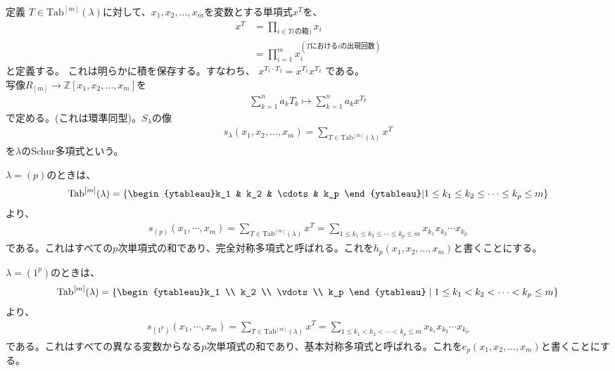 \documentclass[a4paper,11pt]{jsarticle}
\theoremstyle{plain}
\theoremstyle{definition}
\renewcommand{\(}{\left(}
\renewcommand{\)}{\right)}
\renewcommand{\[}{\left[}
\renewcommand{\]}{\right]}
\renewcommand{\{}{\left\lbrace}
\renewcommand{\}}{\right\rbrace}
\newcommand{\Z}{\mathbb{Z}}
\begin{document}
\begin{itembox}[l]{定義}
    $T \in \text{Tab}^{[m]}(\lambda)$に対して、$x_1, x_2, \ldots, x_m$を変数とする単項式$x^T$を、
    \begin{align*}
        x^T &= \prod_{i \in T\text{(の箱)}} x_i\\
        &= \prod_{i=1}^{m} x_i^{(\text{$T$における$i$の出現回数})}
    \end{align*}
    と定義する。
    これは明らかに積を保存する。すなわち、
    $x^{T_1 \cdot T_2} = x^{T_1}x^{T_2}$
    である。\\
    写像$R_{[m]} \to \Z[x_1, x_2, \ldots, x_m]$を
    \begin{align*}
        \sum_{k=1}^{n} a_k T_k \mapsto \sum_{k=1}^{n} a_k x^{T_k}
    \end{align*}
    で定める。(これは環準同型)。$S_{\lambda}$の像
    \begin{align*}
        s_{\lambda}(x_1, x_2, \ldots, x_m) = \sum_{T \in \text{Tab}^{[m]}(\lambda)} x^T
    \end{align*}
    を$\lambda$のSchur多項式という。
\end{itembox}
    $\lambda = (p)$のときは、
    \begin{align*}
        \text{Tab}^{[m]}(\lambda) = \{ \begin{ytableau}k_1 & k_2 & \cdots & k_p \end{ytableau} | 1 \leq k_1 \leq k_2 \leq \cdots \leq k_p \leq m\}
    \end{align*}
    より、
    \begin{align*}
        s_{(p)}(x_1, \cdots, x_m) = \sum_{T \in \text{Tab}^{[m]}(\lambda)} x^T = \sum_{1 \leq k_1 \leq k_2 \leq \cdots \leq k_p \leq m} x_{k_1}x_{k_2} \cdots x_{k_p}
    \end{align*}
    である。これはすべての$p$次単項式の和であり、完全対称多項式と呼ばれる。これを$h_p(x_1, x_2, \ldots, x_m)$と書くことにする。

    $\lambda = (1^p)$のときは、
    \begin{align*}
        \text{Tab}^{[m]}(\lambda) = \{ \begin{ytableau}k_1 \\ k_2 \\ \vdots \\ k_p \end{ytableau}\mid 1 \leq k_1 < k_2 < \cdots < k_p \leq m\}
    \end{align*}
    より、
    \begin{align*}
        s_{(1^p)}(x_1, \cdots, x_m) = \sum_{T \in \text{Tab}^{[m]}(\lambda)} x^T = \sum_{1 \leq k_1 < k_2 < \cdots < k_p \leq m} x_{k_1}x_{k_2} \cdots x_{k_p}
    \end{align*}
    である。これはすべての異なる変数からなる$p$次単項式の和であり、基本対称多項式と呼ばれる。これを$e_p(x_1, x_2, \ldots, x_m)$と書くことにする。
\end{document}
